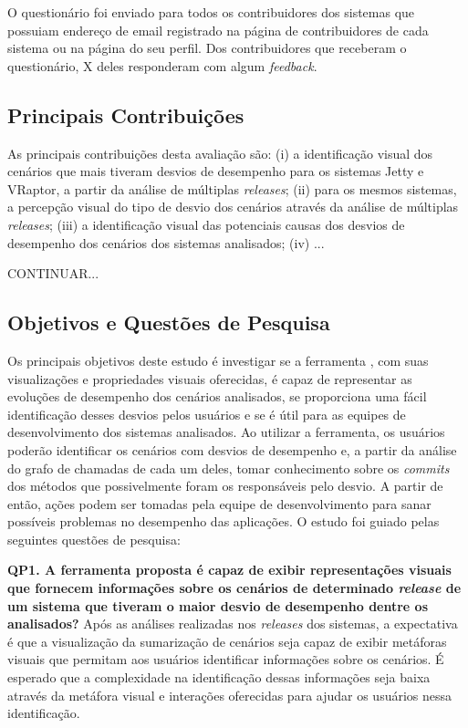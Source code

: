O questionário foi enviado para todos os contribuidores dos sistemas que possuiam endereço de email registrado na página de contribuidores de cada sistema ou na página do seu perfil. Dos contribuidores que receberam o questionário, X deles responderam com algum \textit{feedback}.

\subsection{Principais Contribuições} \label{subsec:avaliacao-principais-contribuicoes}

As principais contribuições desta avaliação são: (i) a identificação visual dos cenários que mais tiveram desvios de desempenho para os sistemas Jetty e VRaptor, a partir da análise de múltiplas \textit{releases}; (ii) para os mesmos sistemas, a percepção visual do tipo de desvio dos cenários através da análise de múltiplas \textit{releases}; (iii) a identificação visual das potenciais causas dos desvios de desempenho dos cenários dos sistemas analisados; (iv) ...

{\color{red}CONTINUAR...}

\subsection{Objetivos e Questões de Pesquisa} \label{subsec:avaliacao-objetivos-questoes-pesquisa}

Os principais objetivos deste estudo é investigar se a ferramenta \textit{\toolName}, com suas visualizações e propriedades visuais oferecidas, é capaz de representar as evoluções de desempenho dos cenários analisados, se proporciona uma fácil identificação desses desvios pelos usuários e se é útil para as equipes de desenvolvimento dos sistemas analisados. Ao utilizar a ferramenta, os usuários poderão identificar os cenários com desvios de desempenho e, a partir da análise do grafo de chamadas de cada um deles, tomar conhecimento sobre os \textit{commits} dos métodos que possivelmente foram os responsáveis pelo desvio. A partir de então, ações podem ser tomadas pela equipe de desenvolvimento para sanar possíveis problemas no desempenho das aplicações. O estudo foi guiado pelas seguintes questões de pesquisa:

\textbf{QP1. A ferramenta proposta é capaz de exibir representações visuais que fornecem informações sobre os cenários de determinado \textit{release} de um sistema que tiveram o maior desvio de desempenho dentre os analisados?} Após as análises realizadas nos \textit{releases} dos sistemas, a expectativa é que a visualização da sumarização de cenários seja capaz de exibir metáforas visuais que permitam aos usuários identificar informações sobre os cenários. É esperado que a complexidade na identificação dessas informações seja baixa através da metáfora visual e interações oferecidas para ajudar os usuários nessa identificação.

